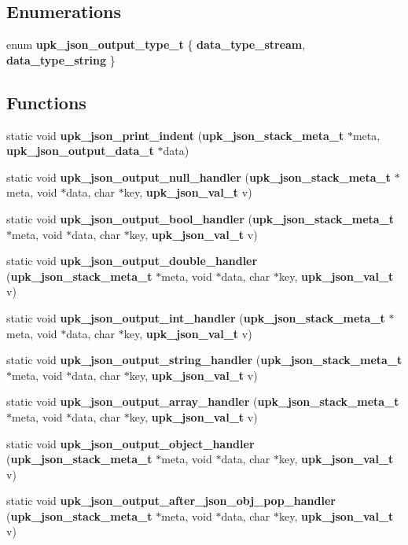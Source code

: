 \subsection*{Enumerations}
\begin{DoxyCompactItemize}
\item 
enum {\bf upk\_\-json\_\-output\_\-type\_\-t} \{ {\bf data\_\-type\_\-stream}, 
{\bf data\_\-type\_\-string}
 \}
\end{DoxyCompactItemize}
\subsection*{Functions}
\begin{DoxyCompactItemize}
\item 
static void {\bf upk\_\-json\_\-print\_\-indent} ({\bf upk\_\-json\_\-stack\_\-meta\_\-t} $\ast$meta, {\bf upk\_\-json\_\-output\_\-data\_\-t} $\ast$data)
\item 
static void {\bf upk\_\-json\_\-output\_\-null\_\-handler} ({\bf upk\_\-json\_\-stack\_\-meta\_\-t} $\ast$meta, void $\ast$data, char $\ast$key, {\bf upk\_\-json\_\-val\_\-t} v)
\item 
static void {\bf upk\_\-json\_\-output\_\-bool\_\-handler} ({\bf upk\_\-json\_\-stack\_\-meta\_\-t} $\ast$meta, void $\ast$data, char $\ast$key, {\bf upk\_\-json\_\-val\_\-t} v)
\item 
static void {\bf upk\_\-json\_\-output\_\-double\_\-handler} ({\bf upk\_\-json\_\-stack\_\-meta\_\-t} $\ast$meta, void $\ast$data, char $\ast$key, {\bf upk\_\-json\_\-val\_\-t} v)
\item 
static void {\bf upk\_\-json\_\-output\_\-int\_\-handler} ({\bf upk\_\-json\_\-stack\_\-meta\_\-t} $\ast$meta, void $\ast$data, char $\ast$key, {\bf upk\_\-json\_\-val\_\-t} v)
\item 
static void {\bf upk\_\-json\_\-output\_\-string\_\-handler} ({\bf upk\_\-json\_\-stack\_\-meta\_\-t} $\ast$meta, void $\ast$data, char $\ast$key, {\bf upk\_\-json\_\-val\_\-t} v)
\item 
static void {\bf upk\_\-json\_\-output\_\-array\_\-handler} ({\bf upk\_\-json\_\-stack\_\-meta\_\-t} $\ast$meta, void $\ast$data, char $\ast$key, {\bf upk\_\-json\_\-val\_\-t} v)
\item 
static void {\bf upk\_\-json\_\-output\_\-object\_\-handler} ({\bf upk\_\-json\_\-stack\_\-meta\_\-t} $\ast$meta, void $\ast$data, char $\ast$key, {\bf upk\_\-json\_\-val\_\-t} v)
\item 
static void {\bf upk\_\-json\_\-output\_\-after\_\-json\_\-obj\_\-pop\_\-handler} ({\bf upk\_\-json\_\-stack\_\-meta\_\-t} $\ast$meta, void $\ast$data, char $\ast$key, {\bf upk\_\-json\_\-val\_\-t} v)

\end{DoxyCompactItemize}
